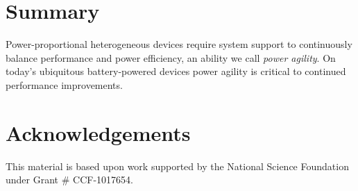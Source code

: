 \section{Summary}

Power-proportional heterogeneous devices require system support to
continuously balance performance and power efficiency, an ability we call
\textit{power agility}. On today's ubiquitous battery-powered devices power
agility is critical to continued performance improvements.

\section*{Acknowledgements}

This material is based upon work supported by the National Science Foundation
under Grant \# CCF-1017654.

